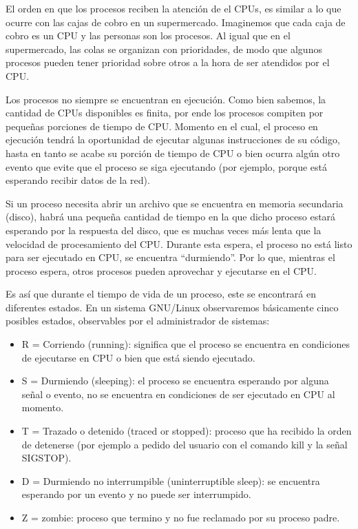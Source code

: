 \documentclass[12pt]{article}
\begin{document}
El orden en que los procesos reciben la atención de el CPUs, es 
similar a lo que ocurre con las cajas de cobro en un supermercado. 
Imaginemos que cada caja de cobro es un CPU y las personas son los 
procesos. Al igual que en el supermercado, las colas se organizan con 
prioridades, de modo que algunos procesos pueden tener prioridad 
sobre otros a la hora de ser atendidos por el CPU. 

Los procesos no siempre se encuentran en ejecución. 
Como bien sabemos, la cantidad de CPUs disponibles es finita, por ende 
los procesos compiten por 
pequeñas porciones de tiempo de CPU. Momento en el cual, el proceso en 
ejecución tendrá la oportunidad de ejecutar algunas instrucciones de su 
código, hasta en tanto se acabe su porción de tiempo de CPU o bien ocurra 
algún otro evento que evite que el proceso se siga ejecutando (por ejemplo, 
porque está esperando recibir datos de la red). 

Si un proceso necesita abrir un archivo que se encuentra en 
memoria secundaria (disco), habrá una pequeña cantidad de tiempo en la que 
dicho proceso estará esperando por la respuesta del disco, que es muchas 
veces más lenta que la velocidad de procesamiento del CPU. Durante esta
espera, el proceso no está listo para ser ejecutado en CPU, se encuentra 
``durmiendo''. Por lo que, mientras el proceso espera, otros procesos 
pueden aprovechar y ejecutarse en el CPU. 
  
Es así que durante el tiempo de vida de un proceso, este se encontrará en 
diferentes estados. En un sistema GNU/Linux observaremos básicamente 
cinco posibles estados, observables por el administrador de sistemas: 

\begin{itemize}
\item R = Corriendo (running): significa que el proceso se encuentra en 
condiciones de ejecutarse en CPU o bien que está siendo ejecutado.  
\item S = Durmiendo (sleeping): el proceso se encuentra esperando por 
alguna señal o evento, no se encuentra en condiciones de ser ejecutado en 
CPU al momento. 
\item T = Trazado o detenido (traced or stopped): proceso que ha recibido 
la orden de detenerse (por ejemplo a pedido del usuario con el comando 
kill y la señal SIGSTOP). 
\item D = Durmiendo no interrumpible (uninterruptible sleep): se encuentra
esperando por un evento y no puede ser interrumpido. 
\item Z = zombie: proceso que termino y no fue reclamado por su proceso 
padre. 
\end{itemize}
\end{document}
